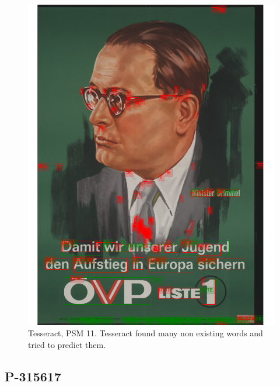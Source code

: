 \begin{figure}[hbtp!]  
      \centering
    \includegraphics[scale=0.36]{obrazky/plakaty/result_tesseract_vienna1_split_psm11-91.png}
    \caption{Tesseract, PSM 11. Tesseract found many non existing words and tried to predict them.}
    \label{Im1:ex:tess11}
\end{figure}

\subsection*{P-315617}


